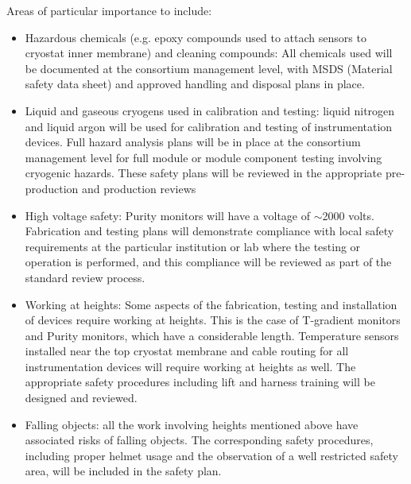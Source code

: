Areas of particular importance to  include:
\begin{itemize}
\item Hazardous chemicals (e.g. epoxy compounds used to attach sensors to cryostat inner membrane) and cleaning compounds:
  All chemicals used will be documented at the consortium management level, with MSDS (Material safety data sheet) and approved handling and disposal plans in place.

\item Liquid and gaseous cryogens used in calibration and testing: liquid nitrogen and liquid argon will be used for calibration and testing of instrumentation devices.
  Full hazard analysis plans will be in place at the consortium management level for full module or
  module component testing involving cryogenic hazards. These safety plans will be reviewed in the appropriate pre-production and production reviews

\item High voltage safety:  Purity monitors will have a voltage of $\sim$2000 volts. Fabrication and testing plans will demonstrate compliance with local
   safety requirements at the particular institution or lab where the testing or operation is performed, and this compliance will be reviewed as part of the standard review process.


\item Working at heights: Some aspects of the fabrication, testing and installation of  devices require working at heights. This is the 
  case of T-gradient monitors and Purity monitors, which have a considerable length. Temperature sensors installed near the top cryostat membrane and cable routing for all instrumentation devices
  will require working at heights as well. The appropriate safety procedures including lift and harness training will be designed and reviewed. 
  
\item Falling objects: all the work involving heights mentioned above have associated risks of falling objects. The corresponding safety procedures, including proper helmet usage 
and the observation of a well restricted safety area, will be included in the safety plan. 
\end{itemize}


